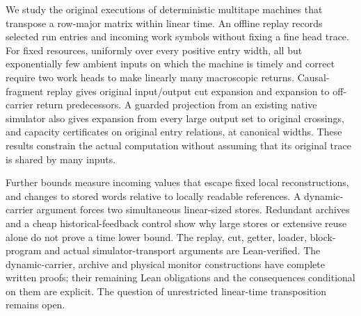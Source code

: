 We study the original executions of deterministic multitape machines that
transpose a row-major matrix within linear time. An offline replay records
selected run entries and incoming work symbols without fixing a fine head
trace. For fixed resources, uniformly over every positive entry width, all
but exponentially few ambient inputs on which the machine is timely and
correct require two work heads to make linearly many macroscopic returns.
Causal-fragment replay gives original input/output cut expansion and
expansion to off-carrier return predecessors. A guarded projection from an
existing native simulator also gives expansion from every large output set
to original crossings, and capacity certificates on original entry relations,
at canonical widths. These results constrain the actual computation without
assuming that its original trace is shared by many inputs.

Further bounds measure incoming values that escape fixed local
reconstructions, and changes to stored words relative to locally readable
references. A dynamic-carrier argument forces two simultaneous linear-sized
stores. Redundant archives and a cheap historical-feedback control show why
large stores or extensive reuse alone do not prove a time lower bound.
The replay, cut, getter, loader, block-program and actual simulator-transport
arguments are Lean-verified. The dynamic-carrier, archive and physical
monitor constructions have complete written proofs; their remaining Lean
obligations and the consequences conditional on them are explicit.
The question of unrestricted linear-time transposition remains open.
